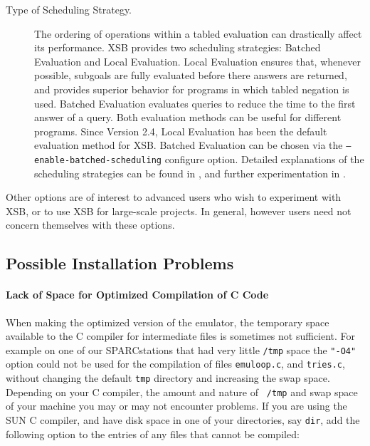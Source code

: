 \begin{description}
\item[Type of Scheduling Strategy.]  The ordering of operations within
a tabled evaluation can drastically affect its performance.  XSB
provides two scheduling strategies: Batched Evaluation and Local
Evaluation.  Local Evaluation ensures that, whenever possible,
subgoals are fully evaluated before there answers are returned, and
provides superior behavior for programs in which tabled negation is
used.  Batched Evaluation evaluates queries to reduce the time to the
first answer of a query.  Both evaluation methods can be useful for
different programs.  Since Version 2.4, Local Evaluation has been the
default evaluation method for XSB.  Batched Evaluation can be chosen
via the {\tt --enable-batched-scheduling} configure option.  Detailed
explanations of the scheduling strategies can be found in
\cite{JFLP-Scheduling}, and further experimentation in \cite{CaSW02}.

%
\end{description}

Other options are of interest to advanced users who wish to experiment
with XSB, or to use XSB for large-scale projects.  In general, however
users need not concern themselves with these options.

\subsection{Possible Installation Problems}


\paragraph*{Lack of Space for Optimized Compilation of C Code}
When making the optimized version of the emulator, the temporary space
available to the C compiler for intermediate files is sometimes not
sufficient. For example on one of our SPARCstations that had very
little {\tt /tmp} space the {\tt "-O4"} option could not be used for
the compilation of files {\tt emuloop.c}, and {\tt tries.c}, without
changing the default {\tt tmp} directory and increasing the swap
space.  Depending on your C compiler, the amount and nature of {\tt
/tmp} and swap space of your machine you may or may not encounter
problems.  If you are using the SUN C compiler, and have disk space in
one of your directories, say {\tt dir}, add the following option to
the entries of any files that cannot be compiled:


